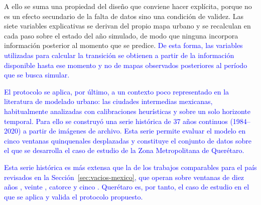 
A ello se suma una propiedad del diseño que conviene hacer explícita, porque no es un efecto secundario de la falta de datos sino una condición de validez. Las siete variables explicativas se derivan del propio mapa urbano y se recalculan en cada paso sobre el estado del año simulado, de modo que ninguna incorpora información posterior al momento que se predice. \textcolor{blue}{De esta forma, las variables utilizadas para calcular la transición se obtienen a partir de la información disponible hasta ese momento y no de mapas observados posteriores al período que se busca simular.}


\textcolor{blue}{El protocolo se aplica, por último, a un contexto poco representado en la literatura de modelado urbano: las ciudades intermedias mexicanas, habitualmente analizadas con calibraciones heurísticas y sobre un solo horizonte temporal. Para ello se construyó una serie histórica de 37 años continuos (1984--2020) a partir de imágenes de archivo. Esta serie permite evaluar el modelo en cinco ventanas quinquenales desplazadas y constituye el conjunto de datos sobre el que se desarrolla el caso de estudio de la Zona Metropolitana de Querétaro.}

\textcolor{blue}{Esta serie histórica es más extensa que la de los trabajos comparables para el país revisados en la Sección~\ref{sec:vacios-mexico}, que operan sobre ventanas de diez años \parencite{SuarezDelgado2007}, veinte \parencite{RamirezHernandez2021}, catorce \parencite{JimenezLopez2018} y cinco \parencite{Chihuahua2023}. Querétaro es, por tanto, el caso de estudio en el que se aplica y valida el protocolo propuesto.}


